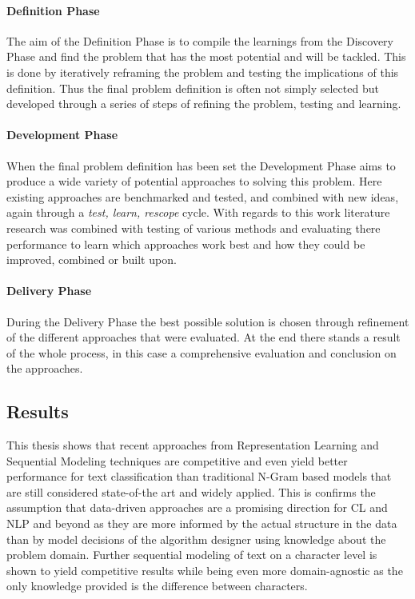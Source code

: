 \paragraph{Definition Phase}
\label{par:Definition Phase}
The aim of the Definition Phase is to compile the learnings from the Discovery Phase and find the problem that has the most potential and will be tackled. This is done by iteratively reframing the problem and testing the implications of this definition.
Thus the final problem definition is often not simply selected but developed through a series of steps of refining the problem, testing and learning.

\paragraph{Development Phase}
\label{par:Development Phase}
When the final problem definition has been set the Development Phase aims to produce a wide variety of potential approaches to solving this problem. Here existing approaches are benchmarked and tested, and combined with new ideas, again through a \emph{test, learn, rescope} cycle.
With regards to this work literature research was combined with testing of various methods and evaluating there performance to learn which approaches work best and how they could be improved, combined or built upon.

\paragraph{Delivery Phase}
\label{par:Delivery Phase}
During the Delivery Phase the best possible solution is chosen through refinement of the different approaches that were evaluated. At the end there stands a result of the whole process, in this case a comprehensive evaluation and conclusion on the approaches.

\subsection{Results}

This thesis shows that recent approaches from Representation Learning and Sequential Modeling techniques are competitive and even yield better performance for text classification than traditional N-Gram based models that are still considered state-of-the art and widely applied. This is confirms the assumption that data-driven approaches are a promising direction for \acrfull{CL} and \acrfull{NLP} and beyond as they are more informed by the actual structure in the data than by model decisions of the algorithm designer using knowledge about the problem domain. Further sequential modeling of text on a character level is shown to yield competitive results while being even more domain-agnostic as the only knowledge provided is the difference between characters.
